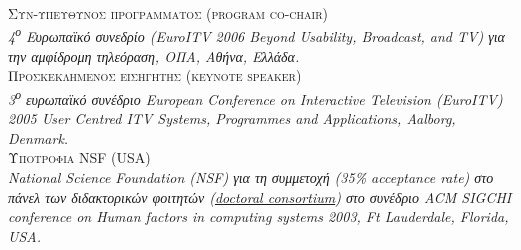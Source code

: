 \documentclass[11pt, a4paper]{article}
\newcommand{\note}[1]{\marginnote{\scriptsize #1}}
\begin{document}
\begin{greek}
\note{2006}\textsc{Συν-υπεύθυνος προγράμματος (program co-chair)}\\
\emph{4\textsuperscript{ο} Ευρωπαϊκό συνεδρίο (EuroITV 2006 Beyond
Usability, Broadcast, and TV) για την αμφίδρομη τηλεόραση, ΟΠΑ, Αθήνα,
Ελλάδα.}\\
\note{2005}\textsc{Προσκεκλημένος εισηγητής (keynote speaker)}\\
\emph{3\textsuperscript{ο} ευρωπαϊκό συνέδριο European Conference on
Interactive Television (EuroITV) 2005 User Centred ITV Systems,
Programmes and Applications, Aalborg, Denmark.}\\
\note{2003}\textsc{Υποτροφία NSF (USA)}\\
\emph{National Science Foundation (NSF) για τη συμμετοχή (35\%
acceptance rate) στο πάνελ των διδακτορικών φοιτητών
(\href{http://www.chi2003.org/doctoral_consortium_program.html}{doctoral
consortium}) στο συνέδριο ACM SIGCHI conference on Human factors in
computing systems 2003, Ft Lauderdale, Florida, USA.}\\


\end{greek}
\end{document}
